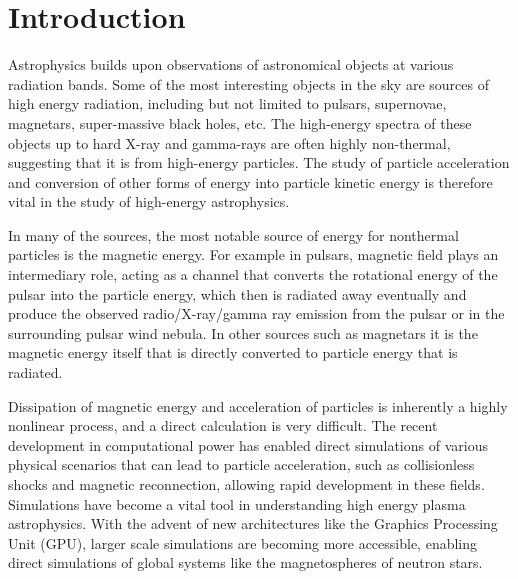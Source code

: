
\chapter{Introduction}
\label{chap:intro}

Astrophysics builds upon observations of astronomical objects at various
radiation bands. Some of the most interesting objects in the sky are sources of
high energy radiation, including but not limited to pulsars, supernovae,
magnetars, super-massive black holes, etc. The high-energy spectra of these
objects up to hard X-ray and gamma-rays are often highly non-thermal, suggesting
that it is from high-energy particles. The study of particle acceleration and
conversion of other forms of energy into particle kinetic energy is therefore
vital in the study of high-energy astrophysics.

In many of the sources, the most notable source of energy for nonthermal
particles is the magnetic energy. For example in pulsars, magnetic field plays
an intermediary role, acting as a channel that converts the rotational energy of
the pulsar into the particle energy, which then is radiated away eventually and
produce the observed radio/X-ray/gamma ray emission from the pulsar or in the
surrounding pulsar wind nebula. In other sources such as magnetars it is the
magnetic energy itself that is directly converted to particle energy that is
radiated.

Dissipation of magnetic energy and acceleration of particles is inherently a
highly nonlinear process, and a direct calculation is very difficult. The recent
development in computational power has enabled direct simulations of various
physical scenarios that can lead to particle acceleration, such as collisionless
shocks and magnetic reconnection, allowing rapid development in these fields.
Simulations have become a vital tool in understanding high energy plasma
astrophysics. With the advent of new architectures like the Graphics Processing
Unit (GPU), larger scale simulations are becoming more accessible, enabling
direct simulations of global systems like the magnetospheres of neutron stars.

